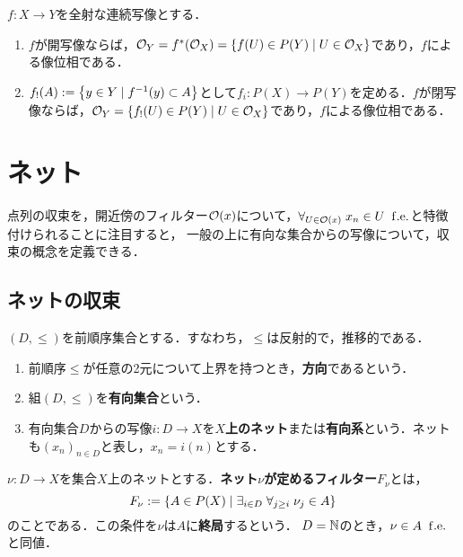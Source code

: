 \documentclass[uplatex,dvipdfmx]{jsreport}
\begin{document}
\begin{proposition}
    $f:X\to Y$を全射な連続写像とする．
    \begin{enumerate}
        \item $f$が開写像ならば，$\mathcal{O}_Y=f^*(\mathcal{O}_X)=\left\{f(U)\in P(Y)\mid U\in\mathcal{O}_X\right\}$であり，$f$による像位相である．
        \item $f_!(A):=\left\{y\in Y\mid f^{-1}(y)\subset A\right\}$として$f_i:P(X)\to P(Y)$を定める．$f$が閉写像ならば，$\mathcal{O}_Y=\left\{f_!(U)\in P(Y)\mid U\in\mathcal{O}_X\right\}$であり，$f$による像位相である．
    \end{enumerate}
\end{proposition}

\section{ネット}

\begin{tcolorbox}[colframe=ForestGreen, colback=ForestGreen!10!white,breakable,colbacktitle=ForestGreen!40!white,coltitle=black,fonttitle=\bfseries\sffamily,
title=]
    点列の収束を，開近傍のフィルター$\mathcal{O}(x)$について，$\forall_{U\in\mathcal{O}(x)}\;x_n\in U\;\;\mathrm{f.e.}$と特徴付けられることに注目すると，
    一般の上に有向な集合からの写像について，収束の概念を定義できる．
\end{tcolorbox}

\subsection{ネットの収束}

\begin{definition}
    $(D,\le)$を前順序集合とする．すなわち，$\le$は反射的で，推移的である．
    \begin{enumerate}
        \item 前順序$\le$が任意の2元について上界を持つとき，\textbf{方向}であるという．
        \item 組$(D,\le)$を\textbf{有向集合}という．
        \item 有向集合$D$からの写像$i:D\to X$を\textbf{$X$上のネット}または\textbf{有向系}という．ネットも$(x_n)_{n\in D}$と表し，$x_n=i(n)$とする．
    \end{enumerate}
\end{definition}

\begin{definition}
        $\nu:D\to X$を集合$X$上のネットとする．\textbf{ネット$\nu$が定めるフィルター}$F_\nu$とは，
        \[F_\nu:=\left\{A\in P(X)\mid \exists_{i\in D}\;\forall_{j\ge i}\;\nu_j\in A\right\}\]
        のことである．この条件を$\nu$は$A$に\textbf{終局}するという．
        $D=\mathbb{N}$のとき，$\nu\in A\;\;\mathrm{f.e.}$と同値．
\end{definition}
\end{document}
